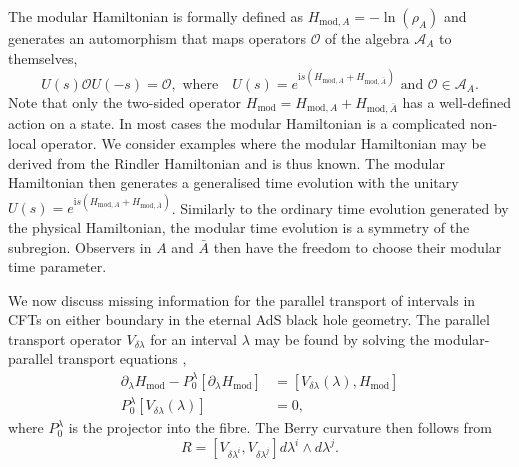 \documentclass[a4paper,11pt]{article}
\renewcommand{\i}{\text{i}}
\newcommand{\1}{\mathds{1}}
\begin{document}
The modular Hamiltonian is formally defined as  $H_{\mathrm{mod},A}=-\ln(\rho_A)$ and generates an automorphism that maps operators $\mathcal{O}$ of the algebra $\mathcal{A}_{A}$ to themselves,
\begin{equation}
	U(s) \mathcal{O} U(-s)=\mathcal{O} , \text{ where} \quad U(s)=e^{\i s(H_{\text{mod}, A}+H_{\text{mod},\bar{A}})} \text{ and } \mathcal{O}\in \mathcal{A}_{A}.
\end{equation}
Note that only the two-sided operator $H_{\text{mod}}=H_{\text{mod}, A}+H_{\text{mod},\bar{A}}$ has a well-defined action on a state. In most cases the modular Hamiltonian is a complicated non-local operator. We consider examples where the modular Hamiltonian may be derived from the Rindler Hamiltonian and is thus known. The modular Hamiltonian then generates a generalised time evolution with the unitary $U(s)=e^{\i s(H_{\text{mod}, A}+H_{\text{mod},\bar{A}})}$. Similarly to the ordinary time evolution generated by the physical Hamiltonian, the modular time evolution is a symmetry of the subregion. Observers in $A$ and $\bar{A}$ then have the freedom to choose their modular time parameter.

We now discuss missing information for the parallel transport of intervals in CFTs on either boundary in the eternal AdS black hole geometry. The parallel transport operator $V_{\delta \lambda}$ for an interval $\lambda$ may be found by solving the modular-parallel transport equations \cite{Czech:2019vih},
\begin{equation}
    \begin{aligned}
        \partial_\lambda H_{\mathrm{mod}}-P_0^\lambda\left[\partial_\lambda H_{\mathrm{mod}}\right] & =\left[V_{\delta \lambda}(\lambda), H_{\mathrm{mod}}\right] \\
        P_0^\lambda\left[V_{\delta \lambda}(\lambda)\right] & =0,\label{eq:modular_Berry_transport}
    \end{aligned}
\end{equation}
where $P_0^\lambda$ is the projector into the fibre.
The Berry curvature then follows from
\begin{equation}
    R=[V_{\delta\lambda^i},V_{\delta\lambda^j}]d\lambda^i\wedge d\lambda^j.
    \label{eq:modular_Berry_Cruvature}
\end{equation}
\end{document}
